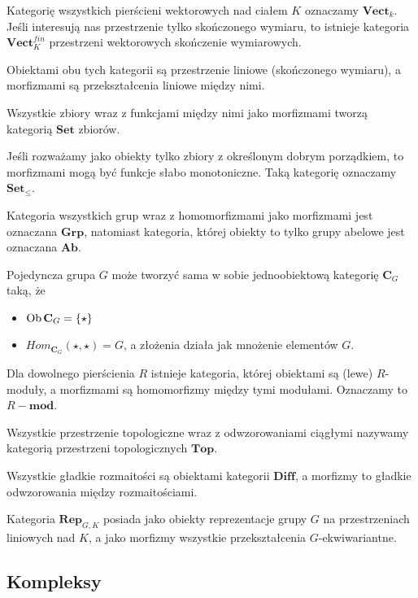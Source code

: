 \begin{example}
\item Kategorię wszystkich pierścieni wektorowych nad ciałem $K$ oznaczamy $\mathbf{Vect}_k$. Jeśli interesują nas przestrzenie tylko skończonego wymiaru, to istnieje kategoria $\mathbf{Vect}_K^{fin}$ przestrzeni wektorowych skończenie wymiarowych. 

  Obiektami obu tych kategorii są przestrzenie liniowe (skończonego wymiaru), a morfizmami są przekształcenia liniowe między nimi.
\item Wszystkie zbiory wraz z funkcjami między nimi jako morfizmami tworzą kategorią $\mathbf{Set}$ zbiorów.
\item Jeśli rozważamy jako obiekty tylko zbiory z określonym dobrym porządkiem, to morfizmami mogą być funkcje słabo monotoniczne. Taką kategorię oznaczamy $\mathbf{Set}_\leq$.
\item Kategoria wszystkich grup wraz z homomorfizmami jako morfizmami jest oznaczana $\mathbf{Grp}$, natomiast kategoria, której obiekty to tylko grupy abelowe jest oznaczana $\mathbf{Ab}$.
\item Pojedyncza grupa $G$ może tworzyć sama w sobie jednoobiektową kategorię $\mathbf{C}_G$ taką, że
  \begin{itemize}
    \item $\operatorname{Ob}\mathbf{C}_G=\{\star\}$
    \item $Hom_{\mathbf{C}_G}(\star,\star)=G$, a złożenia działa jak mnożenie elementów $G$.
    \end{itemize}
\item Dla dowolnego pierścienia $R$ istnieje kategoria, której obiektami są (lewe) $R$-moduły, a morfizmami są homomorfizmy między tymi modułami. Oznaczamy to $R-\mathbf{mod}$.
\item Wszystkie przestrzenie topologiczne wraz z odwzorowaniami ciągłymi nazywamy kategorią przestrzeni topologicznych $\mathbf{Top}$.
\item Wszystkie gładkie rozmaitości są obiektami kategorii $\mathbf{Diff}$, a morfizmy to gładkie odwzorowania między rozmaitościami.
\item Kategoria $\mathbf{Rep}_{G,K}$ posiada jako obiekty reprezentacje grupy $G$ na przestrzeniach liniowych nad $K$, a jako morfizmy wszystkie przekształcenia $G$-ekwiwariantne.
\end{example}

\subsection{Kompleksy}

